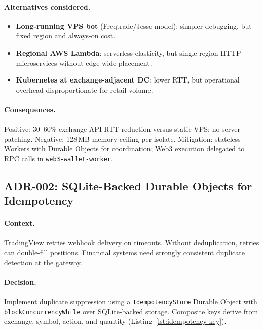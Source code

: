 \paragraph{Alternatives considered.}
\begin{itemize}
  \item \textbf{Long-running VPS bot} (Freqtrade/Jesse model): simpler debugging, but fixed region and always-on cost.
  \item \textbf{Regional AWS Lambda}: serverless elasticity, but single-region HTTP microservices without edge-wide placement.
  \item \textbf{Kubernetes at exchange-adjacent DC}: lower RTT, but operational overhead disproportionate for retail volume.
\end{itemize}

\paragraph{Consequences.} Positive: 30--60\% exchange API RTT reduction versus static VPS; no server patching. Negative: 128\,MB memory ceiling per isolate. Mitigation: stateless Workers with Durable Objects for coordination; Web3 execution delegated to RPC calls in \texttt{web3-wallet-worker}.


\subsection{ADR-002: SQLite-Backed Durable Objects for Idempotency}

\paragraph{Context.} TradingView retries webhook delivery on timeouts. Without deduplication, retries can double-fill positions. Financial systems need strongly consistent duplicate detection at the gateway.

\paragraph{Decision.} Implement duplicate suppression using a \texttt{IdempotencyStore} Durable Object with \texttt{blockConcurrencyWhile} over SQLite-backed storage. Composite keys derive from exchange, symbol, action, and quantity (Listing~\ref{lst:idempotency-key}).

